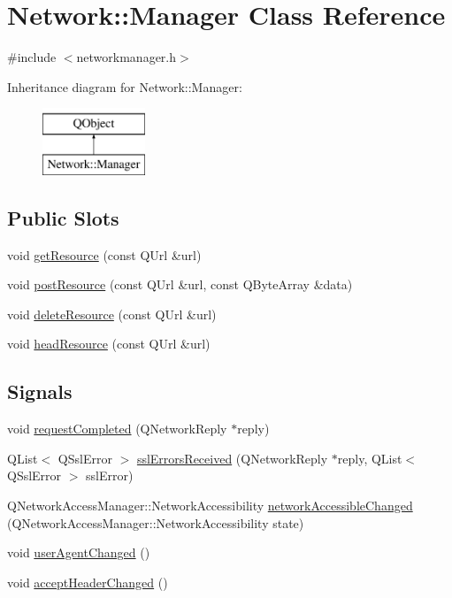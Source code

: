\hypertarget{classNetwork_1_1Manager}{}\section{Network\+:\+:Manager Class Reference}
\label{classNetwork_1_1Manager}


{\ttfamily \#include $<$networkmanager.\+h$>$}

Inheritance diagram for Network\+:\+:Manager\+:\begin{figure}[H]
\begin{center}
\leavevmode
\includegraphics[height=2.000000cm]{classNetwork_1_1Manager}
\end{center}
\end{figure}
\subsection*{Public Slots}
\begin{DoxyCompactItemize}
\item 
void \mbox{\hyperlink{classNetwork_1_1Manager_aa8df583727aa598ee39e6de18b438abe}{get\+Resource}} (const Q\+Url \&url)
\item 
void \mbox{\hyperlink{classNetwork_1_1Manager_a88e7de8604594cf6c2689e8b7a0a6e6e}{post\+Resource}} (const Q\+Url \&url, const Q\+Byte\+Array \&data)
\item 
void \mbox{\hyperlink{classNetwork_1_1Manager_adef1a35e5066157068800847c9366c09}{delete\+Resource}} (const Q\+Url \&url)
\item 
void \mbox{\hyperlink{classNetwork_1_1Manager_a42ef9df33cf238b62e66a5759c316432}{head\+Resource}} (const Q\+Url \&url)
\end{DoxyCompactItemize}
\subsection*{Signals}
\begin{DoxyCompactItemize}
\item 
void \mbox{\hyperlink{classNetwork_1_1Manager_a1863c9a52ea6587387c8a688b92a2204}{request\+Completed}} (Q\+Network\+Reply $\ast$reply)
\item 
Q\+List$<$ Q\+Ssl\+Error $>$ \mbox{\hyperlink{classNetwork_1_1Manager_a4fd0af58f8fcd61b2c17d2dd368693c6}{ssl\+Errors\+Received}} (Q\+Network\+Reply $\ast$reply, Q\+List$<$ Q\+Ssl\+Error $>$ ssl\+Error)
\item 
Q\+Network\+Access\+Manager\+::\+Network\+Accessibility \mbox{\hyperlink{classNetwork_1_1Manager_a39de38077117c92e1e9d6aea325b9537}{network\+Accessible\+Changed}} (Q\+Network\+Access\+Manager\+::\+Network\+Accessibility state)
\item 
void \mbox{\hyperlink{classNetwork_1_1Manager_ad8dd2cecf77ca5869e46b4268e6e0c9a}{user\+Agent\+Changed}} ()
\item 
void \mbox{\hyperlink{classNetwork_1_1Manager_a1f37b9f5fe58a613d5095893e7c9ddb7}{accept\+Header\+Changed}} ()
\end{DoxyCompactItemize}
